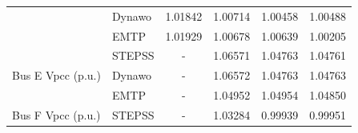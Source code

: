 \documentclass{report}
\begin{document}
\begin{table}[H]
\begin{tabular}{ll|c|c|c|c|}
\multicolumn{1}{l|}{}                                   & Dynawo & 1.01842                                                                           & 1.00714                                                                      & 1.00458                                                                             & 1.00488                                                                       \\
\multicolumn{1}{l|}{}                                   & EMTP   & 1.01929                                                                           & 1.00678                                                                  & 1.00639                                                                             & 1.00205                                                                   \\ \hline
\multicolumn{1}{l|}{\multirow{3}{*}{Bus E Vpcc (p.u.)}} & STEPSS & -                                                                                 & 1.06571                                                                  & 1.04763                                                                             & 1.04761                                                                   \\
\multicolumn{1}{l|}{}                                   & Dynawo & -                                                                                 & 1.06572                                                                      & 1.04763                                                                             & 1.04763                                                                       \\
\multicolumn{1}{l|}{}                                   & EMTP   & -                                                                                  & 1.04952                                                                  & 1.04954                                                                             & 1.04850                                                                   \\ \hline
\multicolumn{1}{l|}{\multirow{3}{*}{Bus F Vpcc (p.u.)}} & STEPSS & -                                                                                 & 1.03284                                                                  & 0.99939                                                                             & 0.99951                                                                   \\

\end{tabular}
\end{table}
\end{document}

